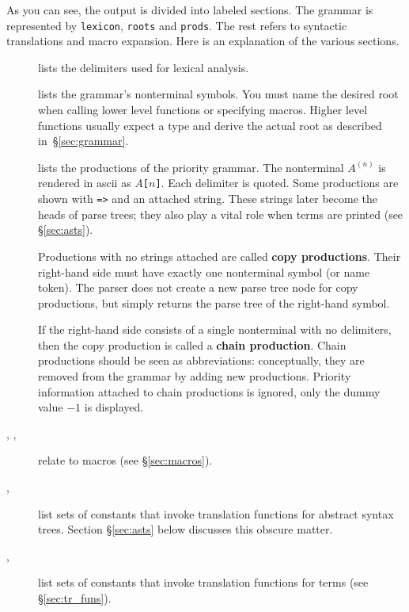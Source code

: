 As you can see, the output is divided into labeled sections.  The grammar
is represented by {\tt lexicon}, {\tt roots} and {\tt prods}.  The rest
refers to syntactic translations and macro expansion.  Here is an
explanation of the various sections.
\begin{description}
  \item[] lists the delimiters used for lexical
    analysis. 

  \item[] lists the grammar's nonterminal symbols.  You must
    name the desired root when calling lower level functions or specifying
    macros.  Higher level functions usually expect a type and derive the
    actual root as described in~\S\ref{sec:grammar}.

  \item[] lists the productions of the priority grammar.
    The nonterminal $A^{(n)}$ is rendered in {\sc ascii} as {\tt $A$[$n$]}.
    Each delimiter is quoted.  Some productions are shown with {\tt =>} and
    an attached string.  These strings later become the heads of parse
    trees; they also play a vital role when terms are printed (see
    \S\ref{sec:asts}).

    Productions with no strings attached are called {\bf copy
      productions}.  Their right-hand side must
    have exactly one nonterminal symbol (or name token).  The parser does
    not create a new parse tree node for copy productions, but simply
    returns the parse tree of the right-hand symbol.

    If the right-hand side consists of a single nonterminal with no
    delimiters, then the copy production is called a {\bf chain
      production}.  Chain productions should
    be seen as abbreviations: conceptually, they are removed from the
    grammar by adding new productions.  Priority information
    attached to chain productions is ignored, only the dummy value $-1$ is
    displayed.

  \item[, , ]
    relate to macros (see \S\ref{sec:macros}).

  \item[, ]
    list sets of constants that invoke translation functions for abstract
    syntax trees.  Section \S\ref{sec:asts} below discusses this obscure
    matter. 

  \item[, ] list sets
    of constants that invoke translation functions for terms (see
    \S\ref{sec:tr_funs}).
\end{description}


